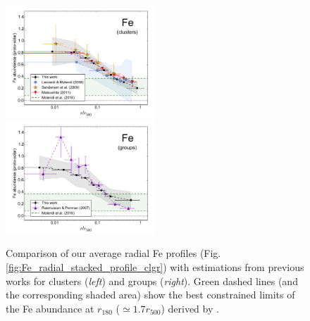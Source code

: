 \documentclass{aa}
\begin{document}
\begin{figure}[!]

                \includegraphics[width=0.5\textwidth]{fig_radial_stacked_Fe_literature_cl.pdf}
                \includegraphics[width=0.5\textwidth]{fig_radial_stacked_Fe_literature_gr.pdf}

        \caption{Comparison of our average radial Fe profiles (Fig. \ref{fig:Fe_radial_stacked_profile_clgr}) with estimations from previous works for clusters (\textit{left}) and groups (\textit{right}). Green dashed lines (and the corresponding shaded area) show the best constrained limits of the Fe abundance at $r_{180}$ ($\simeq 1.7 r_{500}$) derived by \citet{2016A&A...586A..32M}.}
\label{fig:Fe_profiles_literature}
\end{figure}
\end{document}

